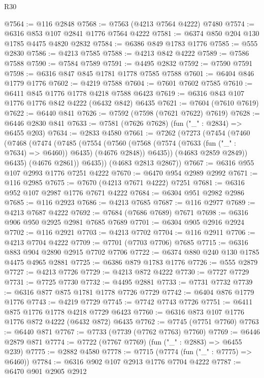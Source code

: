 \begin{lexlean}{R30}
\begin{coremodule}
{{{{{@7564 := @116 @2848
@7568 := @7563 (@4213 @7564 @4222) @7480
@7574 := @6316 @853 @107 @2841 @1776 @7564 @4222
@7581 := @6374 @850 @204 @130 @1785 @4475 @4820 @2832
@7584 := @6386 @849 @1783 @1776
@7585 := @555 @2830
@7586 := @4213 @7585
@7588 := @4213 @842 @4222
@7589 := @7586 @7588
@7590 := @7584 @7589
@7591 := @4495 @2832
@7592 := @7590 @7591
@7598 := @6316 @847 @845 @1781 @1778 @7585 @7588
@7601 := @6404 @846 @1779 @1776
@7602 := @4219 @7588
@7604 := @7601 @7602 @7585
@7610 := @6411 @845 @1776 @1778 @4218 @7588 @6423
@7619 := @6316 @843 @107 @1776 @1776 @842 @4222 (@6432 @842) @6435
@7621 := @7604 (@7610 @7619)
@7622 := @6440 @841
@7626 := @7592 (@7598 (@7621 @7622) @7619)
@7628 := @6446 @2830 @841
@7633 := @7581 (@7626 @7628) (fun ("_" : @2834) => @6455 @203)
@7634 := @2833 @4580
@7661 := @7262
    (@7273
      (@7454
        (@7460
          (@7468
            (@7474
              (@7485
                (@7554
                  (@7560
                    (@7568 (@7574 (@7633 (fun ("_" : @7634) => @6460)) @6435) (@4676 @2848))
                    @6435))
                (@4683 @2859 @2849))
              @6435)
            (@4676 @2861))
          @6435))
      (@4683 @2813 @2867))
@7667 := @6316 @955 @107 @2993 @1776 @7251 @4222
@7670 := @6470 @954 @2989 @2992
@7671 := @116 @2985
@7675 := @7670 (@4213 @7671 @4222) @7251
@7681 := @6316 @952 @107 @2987 @1776 @7671 @4222
@7684 := @6304 @951 @2982 @2986
@7685 := @116 @2923
@7686 := @4213 @7685
@7687 := @116 @2977
@7689 := @4213 @7687 @4222
@7692 := @7684 (@7686 @7689) @7671
@7698 := @6316 @906 @950 @2925 @2981 @7685 @7689
@7701 := @6304 @905 @2916 @2924
@7702 := @116 @2921
@7703 := @4213 @7702
@7704 := @116 @2911
@7706 := @4213 @7704 @4222
@7709 := @7701 (@7703 @7706) @7685
@7715 := @6316 @883 @904 @2890 @2915 @7702 @7706
@7722 := @6374 @880 @240 @130 @1785 @4475 @4965 @2881
@7725 := @6386 @879 @1783 @1776
@7726 := @555 @2879
@7727 := @4213 @7726
@7729 := @4213 @872 @4222
@7730 := @7727 @7729
@7731 := @7725 @7730
@7732 := @4495 @2881
@7733 := @7731 @7732
@7739 := @6316 @877 @875 @1781 @1778 @7726 @7729
@7742 := @6404 @876 @1779 @1776
@7743 := @4219 @7729
@7745 := @7742 @7743 @7726
@7751 := @6411 @875 @1776 @1778 @4218 @7729 @6423
@7760 := @6316 @873 @107 @1776 @1776 @872 @4222 (@6432 @872) @6435
@7762 := @7745 (@7751 @7760)
@7763 := @6440 @871
@7767 := @7733 (@7739 (@7762 @7763) @7760)
@7769 := @6446 @2879 @871
@7774 := @7722 (@7767 @7769) (fun ("_" : @2883) => @6455 @239)
@7775 := @2882 @4580
@7778 := @7715 (@7774 (fun ("_" : @7775) => @6460))
@7784 := @6316 @902 @107 @2913 @1776 @7704 @4222
@7787 := @6470 @901 @2905 @2912
}}}}}
\end{coremodule}
\end{lexlean}

